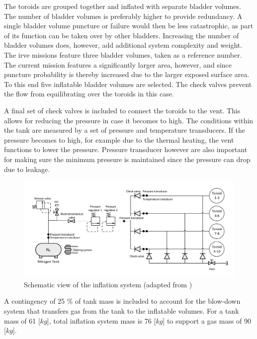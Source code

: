 The toroids are grouped together and inflated with separate bladder volumes.  The number of bladder volumes is preferably higher to provide redundancy. A single bladder volume puncture or failure would then be less catastrophic, as part of its function can be taken over by other bladders. Increasing the number of bladder volumes does, however, add additional system complexity and weight. The \gls{irve} missions feature three bladder volumes, taken as a reference number. The current mission features a significantly larger area, however, and since puncture probability is thereby increased due to the larger exposed surface area. To this end five inflatable bladder volumes are selected. The check valves prevent the flow from equilibrating over the toroids in this case.

A final set of check valves is included to connect the toroids to the vent. This allows for reducing the pressure in case it becomes to high. The conditions within the tank are measured by a set of pressure and temperature transducers. If the pressure becomes to high, for example due to the thermal heating, the vent functions to lower the pressure. Pressure transducer however are also important for making sure the minimum pressure is maintained since the pressure can drop due to leakage. 

\begin{figure}[h]
		\centering
		\includegraphics[width=1.0\textwidth]{./Figure/Structure/infsys.pdf}
		\caption{Schematic view of the inflation system (adapted from \cite{Hughes2005})}
		\label{fig:infsys}
\end{figure}

A contingency of 25 $\%$ of tank mass is included to account for the blow-down system that transfers gas from the tank to the inflatable volumes. For a tank mass of 61 [$kg$], total inflation system mass is 76 [$kg$] to support a gas mass of 90 [$kg$].






